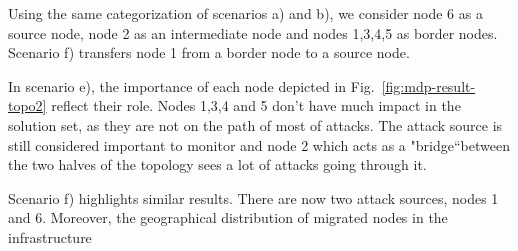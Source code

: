 Using the same categorization of scenarios a) and b), we consider node 6 as a source node, node 2 as an intermediate node and nodes 1,3,4,5 as border nodes. Scenario f) transfers node 1 from a border node to a source node.

In scenario e), the importance of each node depicted in Fig.~\ref{fig:mdp-result-topo2} reflect their role. Nodes 1,3,4 and 5 don't have much impact in the solution set, as they are not on the path of most of attacks. The attack source is still considered important to monitor and node 2 which acts as a "bridge``between the two halves of the topology sees a lot of attacks going through it.

Scenario f) highlights similar results. There are now two attack sources, nodes 1 and 6. Moreover, the geographical distribution of migrated nodes in the infrastructure





